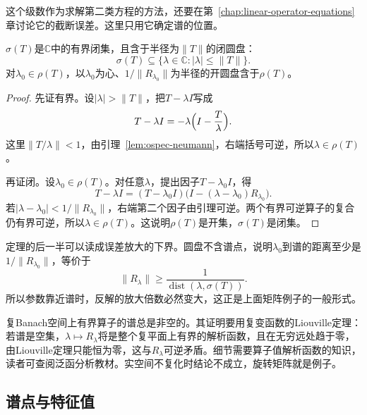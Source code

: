 这个级数作为求解第二类方程的方法，还要在第~\ref{chap:linear-operator-equations}章讨论它的截断误差。这里只用它确定谱的位置。

\begin{theorem}[谱是有界闭集]
\label{thm:ospec-spectrum-compact}
$\sigma(T)$是$\mathbb C$中的有界闭集，且含于半径为$\lVert T\rVert$的闭圆盘：
\begin{equation}
\sigma(T)\subseteq\{\lambda\in\mathbb C:\lvert\lambda\rvert\leq\lVert T\rVert\}.
\label{eq:ospec-spectrum-disk}
\end{equation}
对$\lambda_0\in\rho(T)$，以$\lambda_0$为心、$1/\lVert R_{\lambda_0}\rVert$为半径的开圆盘含于$\rho(T)$。
\end{theorem}

\begin{proof}
先证有界。设$\lvert\lambda\rvert>\lVert T\rVert$，把$T-\lambda I$写成
\[
T-\lambda I=-\lambda\Bigl(I-\frac{T}{\lambda}\Bigr).
\]
这里$\lVert T/\lambda\rVert<1$，由引理~\ref{lem:ospec-neumann}，右端括号可逆，所以$\lambda\in\rho(T)$。

再证闭。设$\lambda_0\in\rho(T)$。对任意$\lambda$，提出因子$T-\lambda_0I$，得
\[
T-\lambda I=(T-\lambda_0I)\bigl(I-(\lambda-\lambda_0)R_{\lambda_0}\bigr).
\]
若$\lvert\lambda-\lambda_0\rvert<1/\lVert R_{\lambda_0}\rVert$，右端第二个因子由引理可逆。两个有界可逆算子的复合仍有界可逆，所以$\lambda\in\rho(T)$。这说明$\rho(T)$是开集，$\sigma(T)$是闭集。
\end{proof}

定理的后一半可以读成误差放大的下界。圆盘不含谱点，说明$\lambda_0$到谱的距离至少是$1/\lVert R_{\lambda_0}\rVert$，等价于
\begin{equation}
\lVert R_{\lambda}\rVert\geq\frac{1}{\operatorname{dist}(\lambda,\sigma(T))} .
\label{eq:ospec-resolvent-lower}
\end{equation}
所以参数靠近谱时，反解的放大倍数必然变大，这正是上面矩阵例子的一般形式。

复Banach空间上有界算子的谱总是非空的。其证明要用复变函数的Liouville定理：若谱是空集，$\lambda\mapsto R_\lambda$将是整个复平面上有界的解析函数，且在无穷远处趋于零，由Liouville定理只能恒为零，这与$R_\lambda$可逆矛盾。细节需要算子值解析函数的知识，读者可查阅泛函分析教材。实空间不复化时结论不成立，旋转矩阵就是例子。

\subsection{谱点与特征值}
\label{sec:ospec-eigenvalues}

